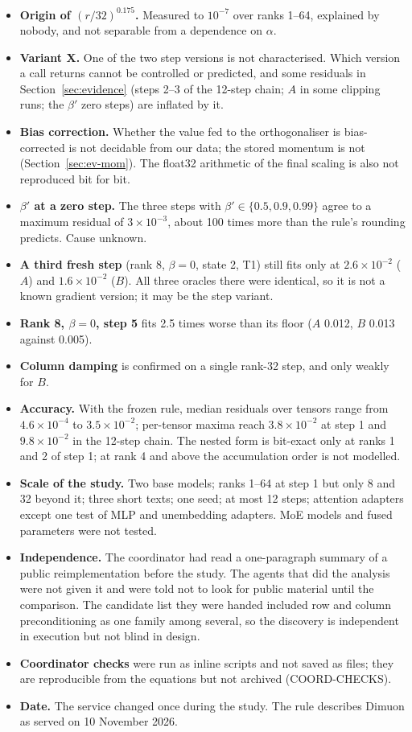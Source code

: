 \documentclass[11pt]{article}
\begin{document}
\begin{itemize}
\item \textbf{Origin of $(r/32)^{0.175}$.} Measured to $10^{-7}$ over ranks 1--64, explained by nobody,
and not separable from a dependence on $\alpha$.
\item \textbf{Variant X.} One of the two step versions is not characterised. Which version a call
returns cannot be controlled or predicted, and some residuals in Section~\ref{sec:evidence} (steps 2--3
of the 12-step chain; $A$ in some clipping runs; the $\beta'$ zero steps) are inflated by it.
\item \textbf{Bias correction.} Whether the value fed to the orthogonaliser is bias-corrected is
not decidable from our data; the stored momentum is not (Section~\ref{sec:ev-mom}). The float32
arithmetic of the final scaling is also not reproduced bit for bit.
\item \textbf{$\beta'$ at a zero step.} The three steps with $\beta'\in\{0.5,0.9,0.99\}$ agree to a
maximum residual of $3\times10^{-3}$, about 100 times more than the rule's rounding predicts. Cause
unknown.
\item \textbf{A third fresh step} (rank 8, $\beta=0$, state 2, T1) still fits only at
$2.6\times10^{-2}$ ($A$) and $1.6\times10^{-2}$ ($B$). All three oracles there were identical, so it is
not a known gradient version; it may be the step variant.
\item \textbf{Rank 8, $\beta=0$, step 5} fits 2.5 times worse than its floor ($A$ 0.012, $B$ 0.013
against 0.005).
\item \textbf{Column damping} is confirmed on a single rank-32 step, and only weakly for $B$.
\item \textbf{Accuracy.} With the frozen rule, median residuals over tensors range from
$4.6\times10^{-4}$ to $3.5\times10^{-2}$; per-tensor maxima reach $3.8\times10^{-2}$ at step 1 and
$9.8\times10^{-2}$ in the 12-step chain. The nested form is bit-exact only at ranks 1 and 2 of step 1;
at rank 4 and above the accumulation order is not modelled.
\item \textbf{Scale of the study.} Two base models; ranks 1--64 at step 1 but only 8 and 32 beyond it;
three short texts; one seed; at most 12 steps; attention adapters except one test of MLP and
unembedding adapters. MoE models and fused parameters were not tested.
\item \textbf{Independence.} The coordinator had read a one-paragraph summary of a public
reimplementation before the study. The agents that did the analysis were not given it and were told
not to look for public material until the comparison. The candidate list they were handed included
row and column preconditioning as one family among several, so the discovery is independent in
execution but not blind in design.
\item \textbf{Coordinator checks} were run as inline scripts and not saved as files; they are
reproducible from the equations but not archived (COORD-CHECKS).
\item \textbf{Date.} The service changed once during the study. The rule describes Dimuon as served on
10 November 2026.
\end{itemize}
\end{document}
